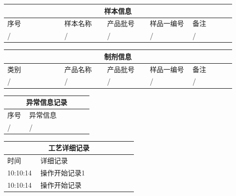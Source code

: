 \documentclass[UTF8,10pt,a4paper,fontset=fandol]{ctexart}
\newcommand{\fieldvalue}[1]{#1}
\begin{document}
\begin{center}
\begin{minipage}[t]{0.46\linewidth}
\medskip
\begin{tabular}{|p{0.24\linewidth}|p{0.18\linewidth}|p{0.18\linewidth}|p{0.18\linewidth}|p{0.18\linewidth}|}
\hline
\multicolumn{5}{c}{\textbf{样本信息}}\\
\hline
序号 & 样本名称 & 产品批号 & 样品一编号 & 备注\\
\hline
\fieldvalue{/} &
\fieldvalue{/} &
\fieldvalue{/} &
\fieldvalue{/} &
\fieldvalue{/}\\
\hline
\end{tabular}

\medskip
\begin{tabular}{|p{0.24\linewidth}|p{0.18\linewidth}|p{0.18\linewidth}|p{0.18\linewidth}|p{0.18\linewidth}|}
\hline
\multicolumn{5}{c}{\textbf{制剂信息}}\\
\hline
类别 & 产品名称 & 产品批号 & 样品一编号 & 备注\\
\hline
\fieldvalue{/} &
\fieldvalue{/} &
\fieldvalue{/} &
\fieldvalue{/} &
\fieldvalue{/}\\
\hline
\end{tabular}

\medskip
\begin{tabular}{|p{0.24\linewidth}|p{0.70\linewidth}|}
\hline
\multicolumn{2}{c}{\textbf{异常信息记录}}\\
\hline
序号 & 异常信息\\
\hline
\fieldvalue{/} &
\fieldvalue{/}\\
\hline
\end{tabular}

\medskip
\begin{tabular}{|p{0.24\linewidth}|p{0.70\linewidth}|}
\hline
\multicolumn{2}{c}{\textbf{工艺详细记录}}\\
\hline
时间 & 详细记录\\
\hline
10:10:14 & 操作开始记录1\\
10:10:14 & 操作开始记录\\
\hline
\end{tabular}


\end{minipage}
\end{center}
\end{document}

